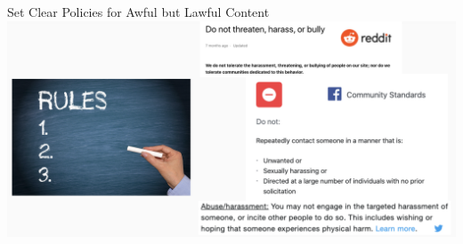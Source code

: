 \documentclass[nobackground,dvipsnames,table]{beamer}
\begin{document}
\begin{frame}{Set Clear Policies for Awful but Lawful Content}
    \includegraphics[width=\textwidth]{content-policies}
\end{frame}
\end{document}
